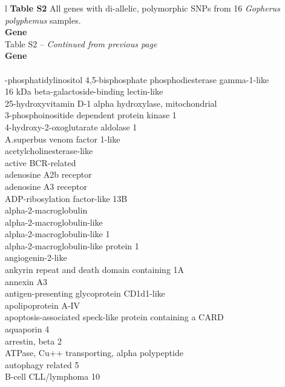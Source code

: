 \documentclass[english]{article}\usepackage[]{graphicx}\usepackage[]{color}
\begin{document}
\pagebreak{}
\begin{longtable}{l}
\noindent
\textbf{Table S2} All genes with di-allelic, polymorphic SNPs from 16 \textit{Gopherus polyphemus} samples.\\
\hline
\textbf{Gene}\\
\hline
\endfirsthead
{}
{Table S2 -- \textit{Continued from previous page}} \\
\hline
\textbf{Gene}\\
\hline
\endhead
\hline {} \\
\endfoot
\hline
{}-phosphatidylinositol 4,5-bisphosphate phosphodiesterase gamma-1-like \\ 
16 kDa beta-galactoside-binding lectin-like \\ 
25-hydroxyvitamin D-1 alpha hydroxylase, mitochondrial \\ 
3-phosphoinositide dependent protein kinase 1 \\ 
4-hydroxy-2-oxoglutarate aldolase 1 \\ 
A.superbus venom factor 1-like \\ 
acetylcholinesterase-like \\ 
active BCR-related \\ 
adenosine A2b receptor \\ 
adenosine A3 receptor \\ 
ADP-ribosylation factor-like 13B \\ 
alpha-2-macroglobulin \\ 
alpha-2-macroglobulin-like \\ 
alpha-2-macroglobulin-like 1 \\ 
alpha-2-macroglobulin-like protein 1 \\ 
angiogenin-2-like \\ 
ankyrin repeat and death domain containing 1A \\ 
annexin A3 \\ 
antigen-presenting glycoprotein CD1d1-like \\ 
apolipoprotein A-IV \\ 
apoptosis-associated speck-like protein containing a CARD \\ 
aquaporin 4 \\ 
arrestin, beta 2 \\ 
ATPase, Cu++ transporting, alpha polypeptide \\ 
autophagy related 5 \\ 
B-cell CLL/lymphoma 10 \\ 

\end{longtable}
\end{document}
